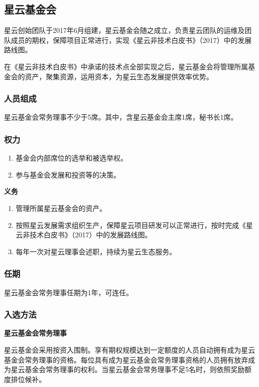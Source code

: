 \subsection{星云基金会}
星云创始团队于2017年6月组建，星云基金会随之成立，负责星云团队的运维及团队成员的期权，保障项目正常进行，实现《星云非技术白皮书》（2017）中的发展路线图。

在《星云非技术白皮书》中承诺的技术点全部实现之后，星云基金会将管理所属基金会的资产，聚集资源，运用资本，为星云生态发展提供效率优势。

\subsubsection{人员组成}
星云基金会常务理事不少于5席。其中，含星云基金会主席1席，秘书长1席。

\subsubsection{权力}
\begin{enumerate}
	\item 基金会内部席位的选举和被选举权。
	\item 参与基金会发展和投资等的决策。
\end{enumerate}
\textbf{义务}
\begin{enumerate}
	\item 管理所属星云基金会的资产。
	\item 按照星云发展需求组织生产，保障星云项目研发可以正常进行，按时完成《星云非技术白皮书》（2017）中的发展路线图。
	\item 每年一次对星云理事会述职，持续为星云生态服务。
\end{enumerate}



\subsubsection{任期}

星云基金会常务理事任期为1年，可连任。

\subsubsection{入选方法}
\textbf{星云基金会常务理事}

星云基金会采用按资入围制。享有期权规模达到一定额度的人员自动拥有成为星云基金会常务理事的资格。每位具有成为星云基金会常务理事资格的人员拥有放弃成为星云基金会常务理事的权利。当星云基金会常务理事不足5名时，则依照奖励额度排位候补。

